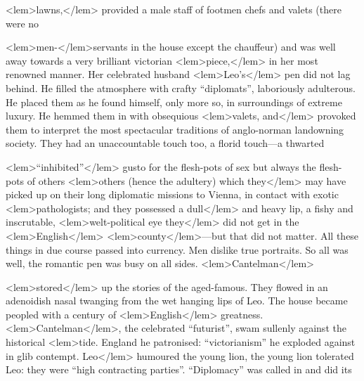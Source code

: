 <lem>lawns,</lem>
						{} 
					provided a male staff of footmen chefs and valets 
					(there were no 
					
<lem>men-</lem>{}servants in the house except the chauffeur) and was well away 
					towards a very brilliant victorian 
<lem>piece,</lem>
						{} 
					in her most renowned manner. Her celebrated 
					husband 
<lem>Leo's</lem>
						{} 
					pen did not lag behind. He filled the atmosphere with crafty 
					“diplomats”, laboriously adulterous. He placed them as he found himself, only more 
					so, in surroundings of extreme luxury. He hemmed them in with obsequious 
<lem>valets, and</lem>
						{} 
					provoked them to interpret the most spectacular traditions of anglo-norman 
					landowning society. They had an unaccountable touch too, a florid touch---a thwarted 
					
<lem>“inhibited”</lem>
						{} 
					gusto for the flesh-pots of sex but always the flesh-pots of others 
<lem>others (hence the adultery) which they</lem>
						{} 
					may have picked up on their long diplomatic missions 
					to Vienna, in contact with exotic 
<lem>pathologists; and they possessed a dull</lem>
						{} 
					and heavy lip, a fishy 
					and inscrutable, 
<lem>welt-political eye they</lem>
						{} 
					did not get in the 
<lem>English</lem>{} 
<lem>county</lem>{}---but 
					that did not matter. All these things in due course passed into currency. Men dislike 
					true portraits. So all was well, the romantic pen was busy on all sides.  
<lem>Cantelman</lem>
						{} 
					
<lem>stored</lem>
						{} 
					up the stories of the aged-famous. They flowed in an adenoidish nasal  
						{}
					twanging from the wet hanging lips of Leo. The house became peopled with 
					a century of 
<lem>English</lem>{} greatness.  
<lem>Cantelman</lem>{}, the celebrated “futurist”, swam sullenly 
against the historical 
<lem>tide. England he patronised: “victorianism” he exploded against in glib contempt. Leo</lem>
						{} 
					humoured the young lion, the young lion tolerated 
					Leo: they were “high contracting parties”. “Diplomacy” was called in and did its 
					
